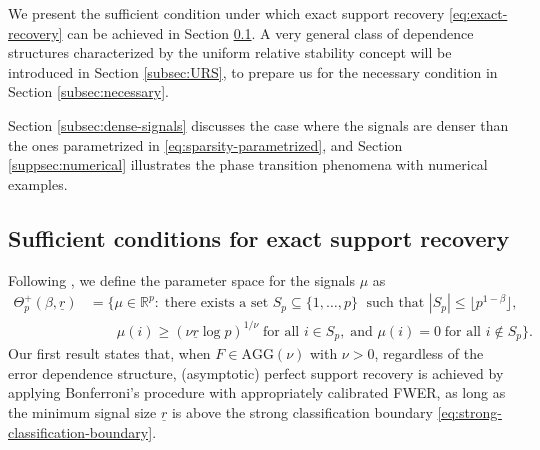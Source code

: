

We present the sufficient condition under which exact support recovery \eqref{eq:exact-recovery} can be achieved in Section \ref{subsec:sufficient}.
A very general class of dependence structures characterized by the uniform relative stability concept will be introduced in Section \ref{subsec:URS}, to prepare us for the necessary condition in Section \ref{subsec:necessary}.

Section \ref{subsec:dense-signals} discusses the case where the signals are denser than the ones parametrized in 
\eqref{eq:sparsity-parametrized}, and Section \ref{suppsec:numerical} illustrates the phase transition phenomena with numerical examples.

\subsection{Sufficient conditions for exact support recovery}
\label{subsec:sufficient}

Following \citet*{butucea2018variable}, we define the parameter space for the signals $\mu$ as
\begin{align} \label{eq:minimax-signal-config-over}
    \Theta_p^+(\beta, \underline{r}) &= \{\mu\in\mathbb{R}^p:\;\text{there exists a set }S_p\subseteq\{1,\ldots,p\}\;\text{ such that }|S_p|\le\lfloor p^{1-\beta}\rfloor, \nonumber \\
    &\quad\quad\mu(i)\ge (\nu\underline{r}\log{p})^{1/\nu}\;\text{for all }i\in S_p,\;\text{and }\mu(i)=0\;\text{for all }i\not\in S_p\}.
\end{align}
Our first result states that, when $F\in \text{AGG}(\nu)$ with $\nu>0$, regardless of the error dependence structure, (asymptotic) perfect support recovery is achieved by applying Bonferroni's procedure with appropriately calibrated FWER, as long as the minimum signal size $\underline{r}$ is above the strong classification boundary \eqref{eq:strong-classification-boundary}.

